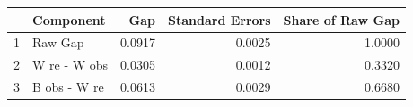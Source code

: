 \begin{table}[ht]
\centering
\begin{tabular}{rlrrr}
  \hline
 & Component & Gap & Standard Errors & Share of Raw Gap \\ 
  \hline
1 & Raw Gap & 0.0917 & 0.0025 & 1.0000 \\ 
  2 & W re - W obs & 0.0305 & 0.0012 & 0.3320 \\ 
  3 & B obs - W re & 0.0613 & 0.0029 & 0.6680 \\ 
   \hline
\end{tabular}
\end{table}
